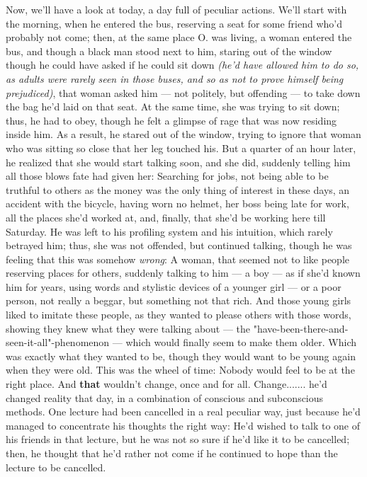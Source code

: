 Now, we'll have a look at today, a day full of peculiar actions. We'll start with the morning, when he entered the bus, reserving a seat for some friend who'd probably not come; then, at the same place O. was living, a woman entered the bus, and though a black man stood next to him, staring out of the window though he could have asked if he could sit down \emph{(he'd have allowed him to do so, as adults were rarely seen in those buses, and so as not to prove himself being prejudiced)}, that woman asked him --- not politely, but offending --- to take down the bag he'd laid on that seat. At the same time, she was trying to sit down; thus, he had to obey, though he felt a glimpse of rage that was now residing inside him. As a result, he stared out of the window, trying to ignore that woman who was sitting so close that her leg touched his. But a quarter of an hour later, he realized that she would start talking soon, and she did, suddenly telling him all those blows fate had given her: Searching for jobs, not being able to be truthful to others as the money was the only thing of interest in these days, an accident with the bicycle, having worn no helmet, her boss being late for work, all the places she'd worked at, and, finally, that she'd be working here till Saturday. He was left to his profiling system and his intuition, which rarely betrayed him; thus, she was not offended, but continued talking, though he was feeling that this was somehow \emph{wrong}: A woman, that seemed not to like people reserving places for others, suddenly talking to him --- a boy --- as if she'd known him for years, using words and stylistic devices of a younger girl --- or a poor person, not really a beggar, but something not that rich. And those young girls liked to imitate these people, as they wanted to please others with those words, showing they knew what they were talking about --- the "have-been-there-and-seen-it-all"-phenomenon --- which would finally seem to make them older. 
Which was exactly what they wanted to be, though they would want to be young again when they were old. This was the wheel of time: Nobody would feel to be at the right place. 
And \textbf{that} wouldn't change, once and for all. Change....... he'd changed reality that day, in a combination of conscious and subconscious methods. One lecture had been cancelled in a real peculiar way, just because he'd managed to concentrate his thoughts the right way: He'd wished to talk to one of his friends in that lecture, but he was not so sure if he'd like it to be cancelled; then, he thought that he'd rather not come if he continued to hope than the lecture to be cancelled. 
